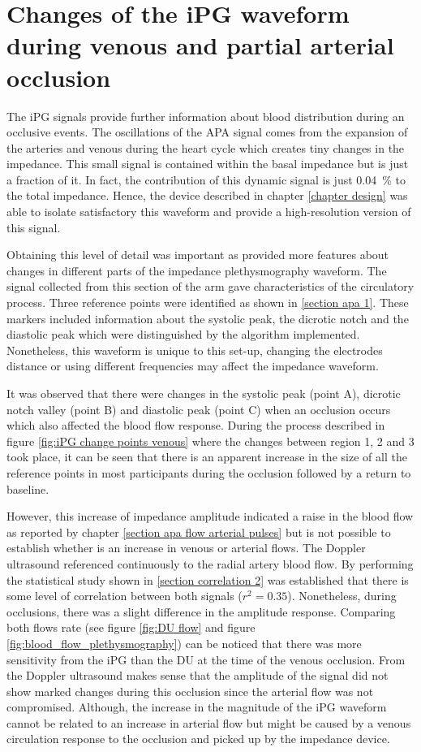 \section{Changes of the iPG waveform during venous and partial arterial occlusion}
The iPG signals provide further information about blood distribution during an occlusive events. The oscillations of the APA signal comes from the expansion of the arteries and venous during the heart cycle which creates tiny changes in the impedance. This small signal is contained within the basal impedance but is just a fraction of it. In fact, the contribution of this dynamic signal is just \SI{0.04}{\percent} to the total impedance. Hence, the device described in chapter \ref{chapter design} was able to isolate satisfactory this waveform and provide a high-resolution version of this signal.

Obtaining this level of detail was important as provided more features about changes in different parts of the impedance plethysmography waveform. The signal collected from this section of the arm gave characteristics of the circulatory process. Three reference points were identified as shown in \ref{section apa 1}. These markers included information about the systolic peak, the dicrotic notch and the diastolic peak which were distinguished by the algorithm implemented. Nonetheless, this waveform is unique to this set-up, changing the electrodes distance or using different frequencies may affect the impedance waveform.

It was observed that there were changes in the systolic peak (point A), dicrotic notch valley (point B) and diastolic peak (point C) when an occlusion occurs which also affected the blood flow response. During the process described in figure \ref{fig:iPG change points venous} where the changes between region 1, 2 and 3 took place, it can be seen that there is an apparent increase in the size of all the reference points in most participants during the occlusion followed by a return to baseline. 

However, this increase of impedance amplitude indicated a raise in the blood flow as reported by chapter \ref{section apa flow arterial pulses} but is not possible to establish whether is an increase in venous or arterial flows. The Doppler ultrasound referenced continuously to the radial artery blood flow. By performing the statistical study shown in \ref{section correlation 2} was established that there is some level of correlation between both signals ($r^2 = 0.35$). Nonetheless, during occlusions, there was a slight difference in the amplitude response. Comparing both flows rate (see figure \ref{fig:DU flow} and figure \ref{fig:blood_flow_plethysmography}) can be noticed that there was more sensitivity from the iPG than the DU at the time of the venous occlusion. From the Doppler ultrasound makes sense that the amplitude of the signal did not show marked changes during this occlusion since the arterial flow was not compromised. Although, the increase in the magnitude of the iPG waveform cannot be related to an increase in arterial flow but might be caused by a venous circulation response to the occlusion and picked up by the impedance device. 

